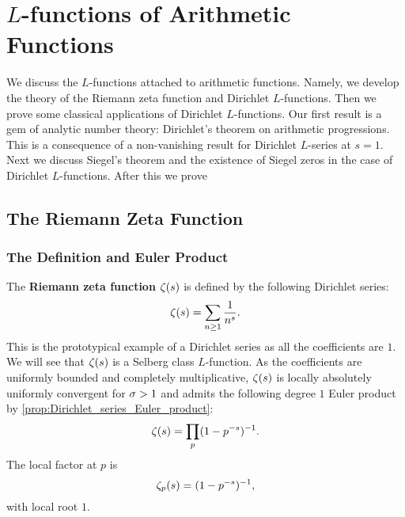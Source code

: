 \chapter{\texorpdfstring{$L$}{L}-functions of Arithmetic Functions}
  We discuss the $L$-functions attached to arithmetic functions. Namely, we develop the theory of the Riemann zeta function and Dirichlet $L$-functions. Then we prove some classical applications of Dirichlet $L$-functions. Our first result is a gem of analytic number theory: Dirichlet's theorem on arithmetic progressions. This is a consequence of a non-vanishing result for Dirichlet $L$-series at $s = 1$. Next we discuss Siegel's theorem and the existence of Siegel zeros in the case of Dirichlet $L$-functions. After this we prove 
  \section{The Riemann Zeta Function}
    \subsection*{The Definition and Euler Product}
      The \textbf{Riemann zeta function} $\zeta(s)$ is defined by the following Dirichlet series:
      \[
        \zeta(s) = \sum_{n \ge 1}\frac{1}{n^{s}}.
      \]
      This is the prototypical example of a Dirichlet series as all the coefficients are $1$. We will see that $\zeta(s)$ is a Selberg class $L$-function. As the coefficients are uniformly bounded and completely multiplicative, $\zeta(s)$ is locally absolutely uniformly convergent for $\sigma > 1$ and admits the following degree $1$ Euler product by \cref{prop:Dirichlet_series_Euler_product}:
      \[
        \zeta(s) = \prod_{p}(1-p^{-s})^{-1}.
      \]
      The local factor at $p$ is
      \[
        \zeta_{p}(s) = (1-p^{-s})^{-1},
      \]
      with local root $1$.
